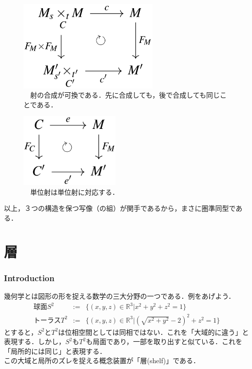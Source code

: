 \documentclass[uplatex, 12pt, a4paper, dvipdfmx]{jsarticle}
\begin{document}
\begin{figure}[ht]\begin{center} \caption{\label{cd-6}　射の合成が可換である．先に合成しても，後で合成しても同じことである．}
    \includegraphics[width=7cm]{cd-6.png}
\end{center}\end{figure}

\begin{figure}[ht]\begin{center} \caption{\label{cd-7}　単位射は単位射に対応する．}
    \includegraphics[width=5cm]{cd-7.png}
\end{center}\end{figure}

以上，３つの構造を保つ写像（の組）が関手であるから，まさに圏準同型である．

\part{層}

\section{Introduction}

幾何学とは図形の形を捉える数学の三大分野の一つである．例をあげよう．
\begin{eqnarray*}球面S^2 &:=& \{ (x,y,z) \in \mathbb{R}^3 | x^2+y^2+z^2 = 1 \} \\ トーラスT^2 &:=& \{ (x,y,z)\in\mathbb{R}^3 | (\sqrt{x^2+y^2}-2)^2 + z^2 = 1 \}\end{eqnarray*}
とすると，$S^2$と$T^2$は位相空間としては同相ではない．これを「大域的に違う」と表現する．しかし，$S^2$も$T^2$も局面であり，一部を取り出すと似ている．これを「局所的には同じ」と表現する．\\
この大域と局所のズレを捉える概念装置が「層(shelf)」である．
\end{document}
